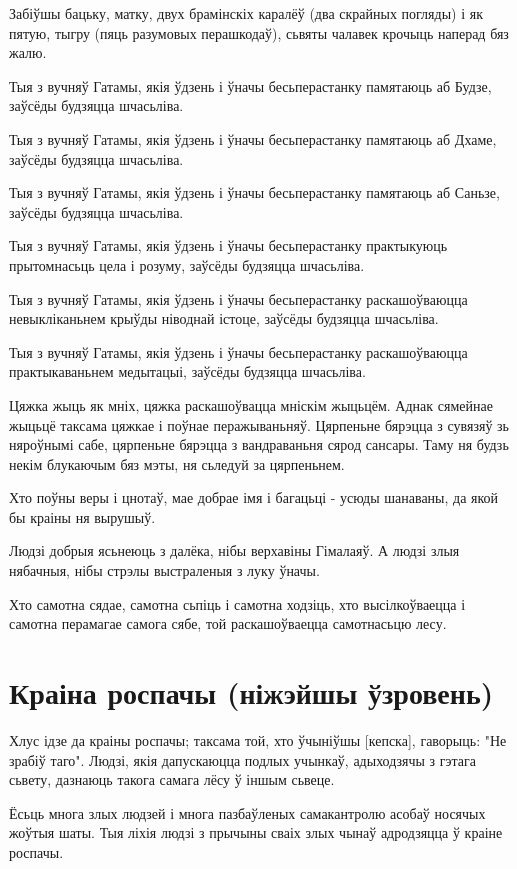 \documentclass{article}
\begin{document}
Забіўшы бацьку, матку, двух брамінскіх каралёў (два скрайных
погляды) і як пятую, тыгру (пяць разумовых перашкодаў), сьвяты чалавек
крочыць наперад бяз жалю.

Тыя з вучняў Гатамы, якія ўдзень і ўначы бесьперастанку памятаюць
аб Будзе, заўсёды будзяцца шчасьліва.

Тыя з вучняў Гатамы, якія ўдзень і ўначы бесьперастанку памятаюць
аб Дхаме, заўсёды будзяцца шчасьліва.

Тыя з вучняў Гатамы, якія ўдзень і ўначы бесьперастанку памятаюць
аб Саньзе, заўсёды будзяцца шчасьліва.

Тыя з вучняў Гатамы, якія ўдзень і ўначы бесьперастанку практыкуюць
прытомнасьць цела і розуму, заўсёды будзяцца шчасьліва.

Тыя з вучняў Гатамы, якія ўдзень і ўначы бесьперастанку
раскашоўваюцца невыкліканьнем крыўды ніводнай істоце, заўсёды будзяцца
шчасьліва.

Тыя з вучняў Гатамы, якія ўдзень і ўначы бесьперастанку
раскашоўваюцца практыкаваньнем медытацыі, заўсёды будзяцца шчасьліва.

Цяжка жыць як мніх, цяжка раскашоўвацца мніскім жыцьцём. Аднак
сямейнае жыцьцё таксама цяжкае і поўнае перажываньняў. Цярпеньне бярэцца
з сувязяў зь няроўнымі сабе, цярпеньне бярэцца з вандраваньня сярод
сансары. Таму ня будзь некім блукаючым бяз мэты, ня сьледуй за
цярпеньнем.

Хто поўны веры і цнотаў, мае добрае імя і багацьці - усюды
шанаваны, да якой бы краіны ня вырушыў.

Людзі добрыя ясьнеюць з далёка, нібы верхавіны Гімалаяў. А людзі
злыя нябачныя, нібы стрэлы выстраленыя з луку ўначы.

Хто самотна сядае, самотна сьпіць і самотна ходзіць, хто
высілкоўваецца і самотна перамагае самога сябе, той раскашоўваецца
самотнасьцю лесу.

\section{Краіна роспачы (ніжэйшы ўзровень)}

Хлус ідзе да краіны роспачы; таксама той, хто ўчыніўшы
{[}кепска{]}, гаворыць: "Не зрабіў таго". Людзі, якія дапускаюцца подлых
учынкаў, адыходзячы з гэтага сьвету, дазнаюць такога самага лёсу ў іншым
сьвеце.

Ёсьць многа злых людзей і многа пазбаўленых самакантролю асобаў
носячых жоўтыя шаты. Тыя ліхія людзі з прычыны сваіх злых чынаў
адродзяцца ў краіне роспачы.
\end{document}
